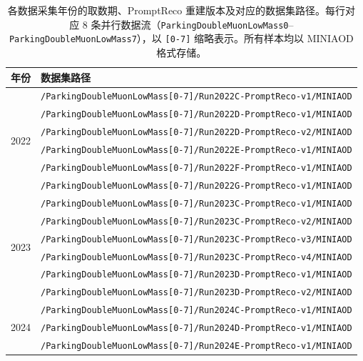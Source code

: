\begin{table}[htbp]
  \centering
  \caption{各数据采集年份的取数期、PromptReco 重建版本及对应的数据集路径。每行对应 8 条并行数据流（\texttt{ParkingDoubleMuonLowMass0}--\texttt{ParkingDoubleMuonLowMass7}），以 \texttt{[0-7]} 缩略表示。所有样本均以 MINIAOD 格式存储。}
  \label{tab:dataset-periods}
  \small
  \begin{tabular}{cl}
    \toprule
    年份 & 数据集路径 \\
    \midrule
    \multirow{6}{*}{2022} & \texttt{/ParkingDoubleMuonLowMass[0-7]/Run2022C-PromptReco-v1/MINIAOD} \\
                          & \texttt{/ParkingDoubleMuonLowMass[0-7]/Run2022D-PromptReco-v1/MINIAOD} \\
                          & \texttt{/ParkingDoubleMuonLowMass[0-7]/Run2022D-PromptReco-v2/MINIAOD} \\
                          & \texttt{/ParkingDoubleMuonLowMass[0-7]/Run2022E-PromptReco-v1/MINIAOD} \\
                          & \texttt{/ParkingDoubleMuonLowMass[0-7]/Run2022F-PromptReco-v1/MINIAOD} \\
                          & \texttt{/ParkingDoubleMuonLowMass[0-7]/Run2022G-PromptReco-v1/MINIAOD} \\
    \midrule
    \multirow{6}{*}{2023} &  \texttt{/ParkingDoubleMuonLowMass[0-7]/Run2023C-PromptReco-v1/MINIAOD} \\
                          &  \texttt{/ParkingDoubleMuonLowMass[0-7]/Run2023C-PromptReco-v2/MINIAOD} \\
                          &  \texttt{/ParkingDoubleMuonLowMass[0-7]/Run2023C-PromptReco-v3/MINIAOD} \\
                          &  \texttt{/ParkingDoubleMuonLowMass[0-7]/Run2023C-PromptReco-v4/MINIAOD} \\
                          &  \texttt{/ParkingDoubleMuonLowMass[0-7]/Run2023D-PromptReco-v1/MINIAOD} \\
                          &  \texttt{/ParkingDoubleMuonLowMass[0-7]/Run2023D-PromptReco-v2/MINIAOD} \\
    \midrule
    \multirow{9}{*}{2024} & \texttt{/ParkingDoubleMuonLowMass[0-7]/Run2024C-PromptReco-v1/MINIAOD} \\
                          & \texttt{/ParkingDoubleMuonLowMass[0-7]/Run2024D-PromptReco-v1/MINIAOD} \\
                          & \texttt{/ParkingDoubleMuonLowMass[0-7]/Run2024E-PromptReco-v1/MINIAOD} \\

\end{tabular}
\end{table}
